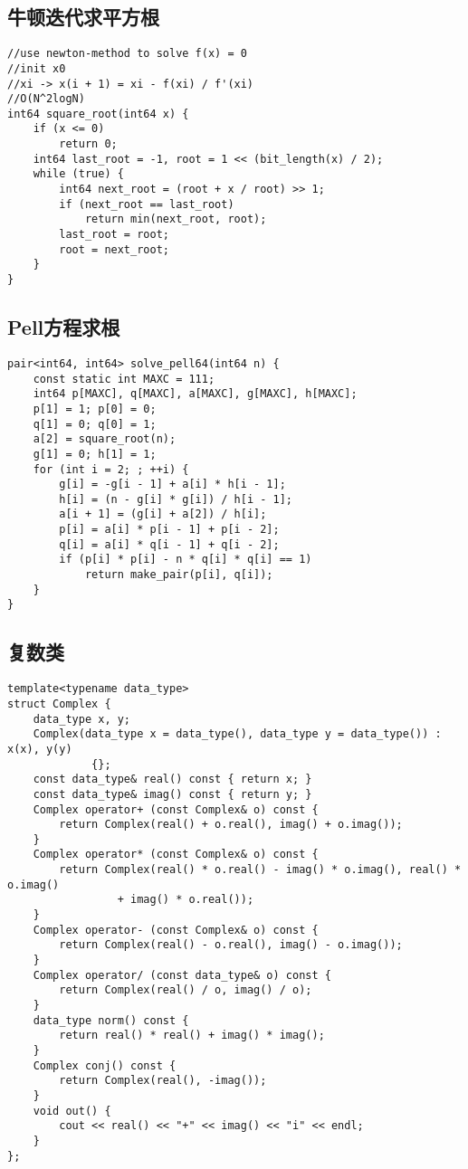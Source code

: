 \documentclass{article}
\begin{document}
\subsection{牛顿迭代求平方根}

\begin{lstlisting}
//use newton-method to solve f(x) = 0
//init x0
//xi -> x(i + 1) = xi - f(xi) / f'(xi)
//O(N^2logN)
int64 square_root(int64 x) {
    if (x <= 0)
        return 0;
    int64 last_root = -1, root = 1 << (bit_length(x) / 2);
    while (true) {
        int64 next_root = (root + x / root) >> 1;
        if (next_root == last_root)
            return min(next_root, root);
        last_root = root;
        root = next_root;
    }
}
\end{lstlisting}

\subsection{Pell方程求根}

\begin{lstlisting}
pair<int64, int64> solve_pell64(int64 n) {
    const static int MAXC = 111;
    int64 p[MAXC], q[MAXC], a[MAXC], g[MAXC], h[MAXC];
    p[1] = 1; p[0] = 0;
    q[1] = 0; q[0] = 1;
    a[2] = square_root(n);
    g[1] = 0; h[1] = 1;
    for (int i = 2; ; ++i) {
        g[i] = -g[i - 1] + a[i] * h[i - 1];
        h[i] = (n - g[i] * g[i]) / h[i - 1];
        a[i + 1] = (g[i] + a[2]) / h[i];
        p[i] = a[i] * p[i - 1] + p[i - 2];
        q[i] = a[i] * q[i - 1] + q[i - 2];
        if (p[i] * p[i] - n * q[i] * q[i] == 1)
            return make_pair(p[i], q[i]);
    }
}
\end{lstlisting}

\subsection{复数类}

\begin{lstlisting}
template<typename data_type>
struct Complex {
    data_type x, y;
    Complex(data_type x = data_type(), data_type y = data_type()) : x(x), y(y)
             {};
    const data_type& real() const { return x; }
    const data_type& imag() const { return y; }
    Complex operator+ (const Complex& o) const {
        return Complex(real() + o.real(), imag() + o.imag());
    }
    Complex operator* (const Complex& o) const {
        return Complex(real() * o.real() - imag() * o.imag(), real() * o.imag()
                 + imag() * o.real());
    }
    Complex operator- (const Complex& o) const {
        return Complex(real() - o.real(), imag() - o.imag());
    }
    Complex operator/ (const data_type& o) const {
        return Complex(real() / o, imag() / o);
    }
    data_type norm() const {
        return real() * real() + imag() * imag();
    }
    Complex conj() const {
        return Complex(real(), -imag());
    }
    void out() {
        cout << real() << "+" << imag() << "i" << endl;
    }
};
\end{lstlisting}
\end{document}
